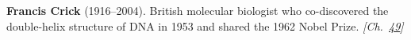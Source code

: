 \nobelmedicine \textbf{Francis Crick} (1916–2004). British molecular biologist who co-discovered the double-helix structure of DNA in 1953 and shared the 1962 Nobel Prize. \emph{[Ch.~\hyperref[ch:ivfmtdna]{49}]}

